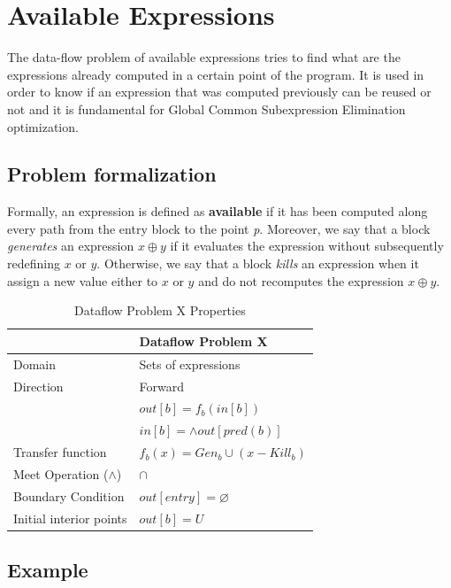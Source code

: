 \documentclass{article}
\begin{document}
\section{Available Expressions}

The data-flow problem of available expressions tries to find what are the expressions already computed in a certain point of the program. It is used in order to know if an expression that was computed previously can be reused or not and it is fundamental for Global Common Subexpression Elimination optimization.

\subsection{Problem formalization}

Formally, an expression is defined as \textbf{available} if it has been computed along every path from the entry block to the point \textit{p}. Moreover, we say that a block \textit{generates} an expression $x \oplus y$ if it evaluates the expression without subsequently redefining $x$ or $y$. Otherwise, we say that a block \textit{kills} an expression when it assign a new value either to $x$ or $y$ and do not recomputes the expression $x \oplus y$.

\begin{table}[H]
\centering
\begin{tabular}{|p{}|p{}|}
\hline
 & \textbf{Dataflow Problem X} \\
\hline
Domain & Sets of expressions \\
\hline
Direction & Forward \\
 & $out[b] = f_b(in[b])$ \\
 & $in[b] = \wedge out[pred(b)]$ \\
\hline
Transfer function & $f_b(x) = Gen_b \cup (x - Kill_b)$ \\
\hline
Meet Operation ($\wedge$) & $\cap$ \\
\hline
Boundary Condition & $out[entry] = \varnothing$ \\
\hline
Initial interior points & $out[b] = U$ \\
\hline
\end{tabular}
\caption{Dataflow Problem X Properties}
\label{tab:dataflow_problem_x}
\end{table}

\subsection{Example}
\end{document}
